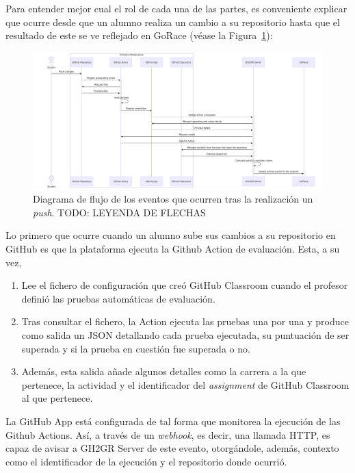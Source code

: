 Para entender mejor cual el rol de cada una de las partes, es conveniente explicar que ocurre desde que un alumno realiza un cambio a su repositorio hasta que el resultado de este se ve reflejado en GoRace (véase la Figura~\ref{fig:enter-label}):

\begin{figure}
    \centering
    \includegraphics[width=\linewidth]{images/flow-after-push.png}
    \caption{Diagrama de flujo de los eventos que ocurren tras la realización un \textit{push}. TODO: LEYENDA DE FLECHAS}
    \label{fig:enter-label}
\end{figure}

Lo primero que ocurre cuando un alumno sube sus cambios a su repositorio en GitHub es que la plataforma ejecuta la Github Action de evaluación. Esta, a su vez, 
\begin{enumerate}
\item Lee el fichero de configuración que creó GitHub Classroom cuando el profesor definió las pruebas automáticas de evaluación. 
\item Tras consultar el fichero, la Action ejecuta las pruebas una por una y produce como salida un \acrshort{JSON} detallando cada prueba ejecutada, su puntuación de ser superada y si la prueba en cuestión fue superada o no. 
\item Además, esta salida añade algunos detalles como la carrera a la que pertenece, la actividad y el identificador del \textit{assignment} de GitHub Classroom al que pertenece.
\end{enumerate}

La GitHub App está configurada de tal forma que monitorea la ejecución de las Github Actions. 
Así, a través de un \textit{webhook}, es decir, una llamada \acrshort{HTTP}, es capaz de avisar a GH2GR Server de este evento, otorgándole, además, contexto como el identificador de la ejecución y el repositorio donde ocurrió. 

